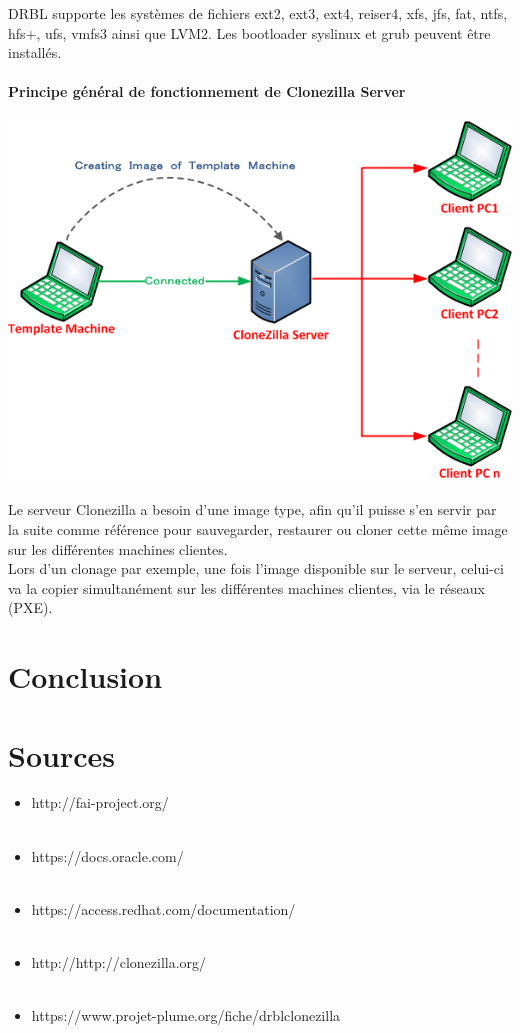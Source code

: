 \documentclass[a4paper,12pt,one side,titlepage]{report}
\begin{document}
DRBL supporte les systèmes de fichiers ext2, ext3, ext4, reiser4, xfs, jfs, fat, ntfs, hfs+, ufs, vmfs3 ainsi que LVM2. Les bootloader syslinux et grub peuvent être installés.

\subsubsection{Principe général de fonctionnement de Clonezilla Server}
\vspace{1em}
\begin{center}\includegraphics[scale=0.7]{./img/clonezilla2.png}\end{center}
\vspace{1em}
Le serveur Clonezilla a besoin d'une image type, afin qu'il puisse s'en servir par la suite comme référence pour sauvegarder, restaurer ou cloner cette même image sur les différentes machines clientes.\\
Lors d'un clonage par exemple, une fois l'image disponible sur le serveur, celui-ci va la copier simultanément sur les différentes machines clientes, via le réseaux (PXE).

\chapter{Conclusion}

\chapter{Sources}
\begin{itemize}
  \item http://fai-project.org/\\\\
  \item https://docs.oracle.com/\\\\
  \item https://access.redhat.com/documentation/\\\\
  \item http://http://clonezilla.org/\\\\
  \item https://www.projet-plume.org/fiche/drblclonezilla\\\\
\end{itemize}
\end{document}
